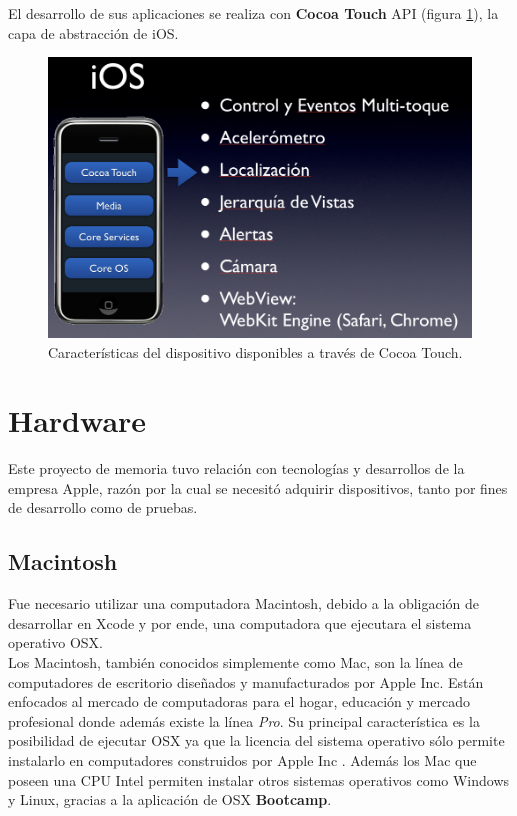 El desarrollo de sus aplicaciones se realiza con \textbf{Cocoa Touch} API (figura \ref{fig:ios-cocoatouch}), la capa de abstracción de iOS.
\begin{figure}[H]
	\centering
	\includegraphics[scale=0.31]{imgs/ios-cocoatouch.png} 
	\caption{Características del dispositivo disponibles a través de Cocoa Touch.}
	\label{fig:ios-cocoatouch}
\end{figure}  


	\section{Hardware}
		Este proyecto de memoria tuvo relación con tecnologías y desarrollos de la empresa Apple, razón por la cual se necesitó adquirir dispositivos, tanto por fines de desarrollo como de pruebas.
		\subsection{Macintosh}
		Fue necesario utilizar una computadora Macintosh, debido a la obligación de desarrollar en Xcode y por ende, una computadora que ejecutara el sistema operativo OSX.\\
		
\enlargethispage{2\baselineskip}
		Los Macintosh, también conocidos simplemente como Mac, son la línea de computadores de escritorio diseñados y manufacturados por Apple Inc. Están enfocados al mercado de computadoras para el hogar, educación y mercado profesional donde además existe la línea \textit{Pro}. Su principal característica es la posibilidad de ejecutar OSX ya que la licencia del sistema operativo sólo permite instalarlo en computadores construidos por Apple Inc \cite{web:license-osx}. Además los Mac que poseen una CPU Intel permiten instalar otros sistemas operativos como Windows y Linux, gracias a la aplicación de OSX \textbf{Bootcamp}.\\
		
